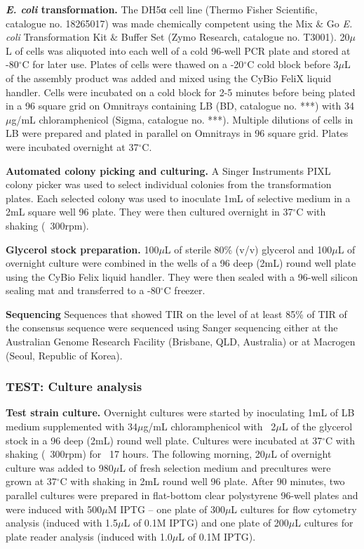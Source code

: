 \textbf{\textit{E. coli} transformation.}
The DH5α cell line (Thermo Fisher Scientific, catalogue no. 18265017) was made chemically competent using the Mix $\&$ Go \textit{E. coli} Transformation Kit $\&$ Buffer Set (Zymo Research, catalogue no. T3001).
20$\mu$L of cells was aliquoted into each well of a cold 96-well PCR plate and stored at -80$^{\circ}$C for later use.
Plates of cells were thawed on a -20$^{\circ}$C cold block before 3$\mu$L of the assembly product was added and mixed using the CyBio FeliX liquid handler.
Cells were incubated on a cold block for 2-5 minutes before being plated in a 96 square grid on Omnitrays containing LB (BD, catalogue no. ***) with 34$\mu$g/mL chloramphenicol (Sigma, catalogue no. ***).
Multiple dilutions of cells in LB were prepared and plated in parallel on Omnitrays in 96 square grid. Plates were incubated overnight at 37$^{\circ}$C.

\textbf{Automated colony picking and culturing.}
A Singer Instruments PIXL colony picker was used to select individual colonies from the transformation plates.
Each selected colony was used to inoculate 1mL of selective medium in a 2mL square well 96 plate.
They were then cultured overnight in 37$^{\circ}$C with shaking (~300rpm).

\textbf{Glycerol stock preparation.}
100$\mu$L of sterile 80\% (v/v) glycerol and 100$\mu$L of overnight culture were combined in the wells of a 96 deep (2mL) round well plate using the CyBio Felix liquid handler.
They were then sealed with a 96-well silicon sealing mat and transferred to a -80$^{\circ}$C freezer. 

\textbf{Sequencing}
Sequences that showed TIR on the level of at least 85\% of TIR of the consensus sequence were sequenced using Sanger sequencing either at the Australian Genome Research Facility (Brisbane, QLD, Australia) or at Macrogen (Seoul, Republic of Korea).


\subsubsection{TEST: Culture analysis}

\textbf{Test strain culture.}
Overnight cultures were started by inoculating 1mL of LB medium supplemented with 34$\mu$g/mL chloramphenicol with ~2$\mu$L of the glycerol stock in a 96 deep (2mL) round well plate.
Cultures were incubated at 37$^{\circ}$C with shaking (~300rpm) for ~17 hours. The following morning, 20$\mu$L of overnight culture was added to 980$\mu$L of fresh selection medium and precultures were grown at 37$^{\circ}$C with shaking in 2mL round well 96 plate. 
After 90 minutes, two parallel cultures were prepared in flat-bottom clear polystyrene 96-well plates and were induced with 500$\mu$M IPTG – one plate of 300$\mu$L cultures for flow cytometry analysis (induced with 1.5$\mu$L of 0.1M IPTG) and one plate of 200$\mu$L cultures for plate reader analysis (induced with 1.0$\mu$L of 0.1M IPTG).


